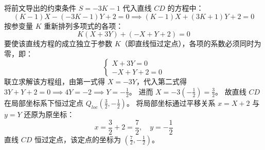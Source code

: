 \begin{solution}
将前文导出的约束条件 $S = -3K - 1$ 代入直线 $CD$ 的方程中：
$$ (K-1)X - (-3K-1)Y + 2 = 0 \implies (K-1)X + (3K+1)Y + 2 = 0 $$
按参变量 $K$ 重新排列多项式的各项：
$$ K(X + 3Y) + (-X + Y + 2) = 0 $$
要使该直线方程的成立独立于参数 $K$（即直线恒过定点），各项的系数必须同时为零，即：
$$ \begin{cases} X + 3Y = 0 \\ -X + Y + 2 = 0 \end{cases} $$
联立求解该方程组，由第一式得 $X = -3Y$，代入第二式得 $3Y + Y + 2 = 0 \implies 4Y = -2 \implies Y = -\frac{1}{2}$。
进而 $X = -3\left(-\frac{1}{2}\right) = \frac{3}{2}$。
故直线 $CD$ 在局部坐标系下恒过定点 $Q_{loc}\left(\frac{3}{2}, -\frac{1}{2}\right)$。
将局部坐标通过平移关系 $x = X + 2$ 与 $y = Y$ 还原为原坐标：
$$ x = \frac{3}{2} + 2 = \frac{7}{2}, \quad y = -\frac{1}{2} $$
直线 $CD$ 恒过定点，该定点的坐标为 $\left(\frac{7}{2}, -\frac{1}{2}\right)$。
\end{solution}

